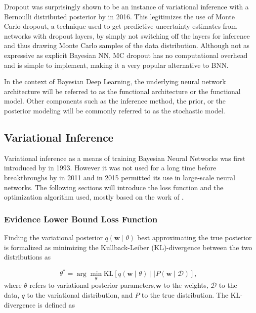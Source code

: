 	Dropout was surprisingly shown to be an instance of variational inference with a Bernoulli distributed posterior by \citet{gal_dropout_2016} in 2016. This legitimizes the use of Monte Carlo dropout, a technique used to get predictive uncertainty estimates from networks with dropout layers, by simply not switching off the layers for inference and thus drawing Monte Carlo samples of the data distribution. Although not as expressive as explicit Bayesian NN, MC dropout has no computational overhead and is simple to implement, making it a very popular alternative to BNN. 
	
	In the context of Bayesian Deep Learning, the underlying neural network architecture will be referred to as the functional architecture or the functional model. Other components such as the inference method, the prior,  or the posterior modeling will be commonly referred to as the stochastic model. 
	
	

\subsection{Variational Inference}
\label{section:vi}


	Variational inference as a means of training Bayesian Neural Networks was first introduced by \citet{hinton_keeping_1993} in 1993. However it was not used for a long time before breakthroughs by \citet{graves_practical_2011} in 2011 and \citet{blundell_weight_2015} in 2015 permitted its use in large-scale neural networks. The following sections will introduce the loss function and the optimization algorithm used, mostly based on the work of \citet{blundell_weight_2015}.
	
	\subsubsection*{Evidence Lower Bound Loss Function}
	Finding the variational posterior $q(\pmb{w} \mid \theta)$ best approximating the true posterior is formalized as minimizing the Kullback-Leiber (KL)-divergence between the two distributions as 
	
	\begin{equation}
		\label{eq:kl}
		\theta^* = \arg \min_{\theta} \mathrm{KL}
		\left[
		q(\pmb{w} \mid \theta) 
		\mid \mid 
		P(\pmb{w} \mid \mathcal{D})
		\right],
	\end{equation}
	where $\theta$ refers to variational posterior parameters,$\pmb{w}$ to the weights, $\mathcal{D}$ to the data, $q$ to the variational distribution, and $P$ to the true distribution. The KL-divergence is defined as \cite{bishop2006pattern}
	
